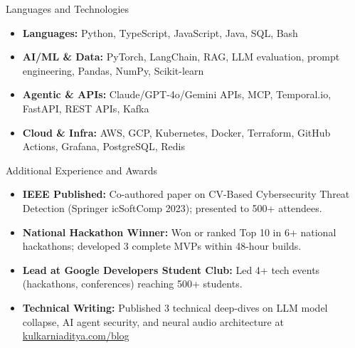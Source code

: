 \documentclass[]{mcdowellcv}
\begin{document}
\begin{cvsection}{Languages and Technologies}
  \begin{cvsubsection}{}{}{}
    \begin{itemize}
      \item \textbf{Languages:} Python, TypeScript, JavaScript, Java, SQL, Bash
      \item \textbf{AI/ML \& Data:} PyTorch, LangChain, RAG, LLM evaluation, prompt engineering, Pandas, NumPy, Scikit-learn
      \item \textbf{Agentic \& APIs:} Claude/GPT-4o/Gemini APIs, MCP, Temporal.io, FastAPI, REST APIs, Kafka
      \item \textbf{Cloud \& Infra:} AWS, GCP, Kubernetes, Docker, Terraform, GitHub Actions, Grafana, PostgreSQL, Redis
    \end{itemize}
  \end{cvsubsection}
\end{cvsection}

\begin{cvsection}{Additional Experience and Awards}
  \begin{cvsubsection}{}{}{}
    \begin{itemize}
      \item \textbf{IEEE Published:} Co-authored paper on CV-Based Cybersecurity Threat Detection (Springer icSoftComp 2023); presented to 500+ attendees.
      \item \textbf{National Hackathon Winner:} Won or ranked Top 10 in 6+ national hackathons; developed 3 complete MVPs within 48-hour builds.
      \item \textbf{Lead at Google Developers Student Club:} Led 4+ tech events (hackathons, conferences) reaching 500+ students.
      \item \textbf{Technical Writing:} Published 3 technical deep-dives on LLM model collapse, AI agent security, and neural audio architecture at \href{https://www.kulkarniaditya.com/blog}{kulkarniaditya.com/blog}
    \end{itemize}
  \end{cvsubsection}
\end{cvsection}
\end{document}
